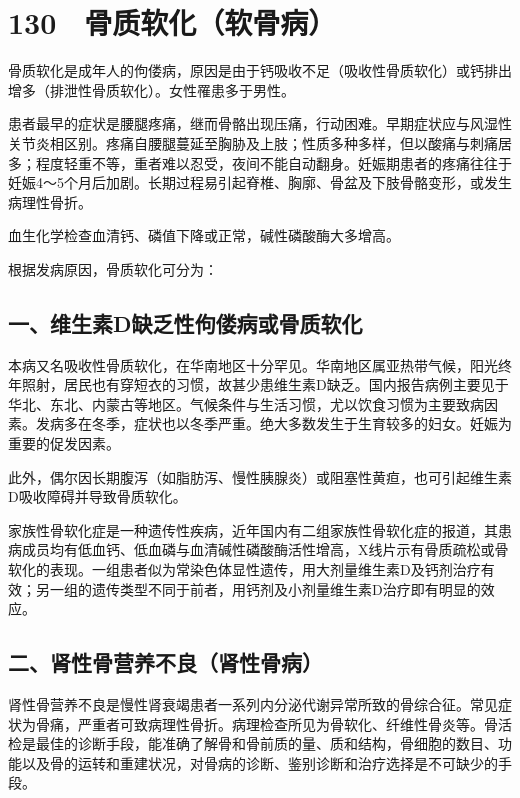 \protect\hypertarget{text00308.html}{}{}

\section{130　骨质软化（软骨病）}

骨质软化是成年人的佝偻病，原因是由于钙吸收不足（吸收性骨质软化）或钙排出增多（排泄性骨质软化）。女性罹患多于男性。

患者最早的症状是腰腿疼痛，继而骨骼出现压痛，行动困难。早期症状应与风湿性关节炎相区别。疼痛自腰腿蔓延至胸胁及上肢；性质多种多样，但以酸痛与刺痛居多；程度轻重不等，重者难以忍受，夜间不能自动翻身。妊娠期患者的疼痛往往于妊娠4～5个月后加剧。长期过程易引起脊椎、胸廓、骨盆及下肢骨骼变形，或发生病理性骨折。

血生化学检查血清钙、磷值下降或正常，碱性磷酸酶大多增高。

根据发病原因，骨质软化可分为：

\subsection{一、维生素D缺乏性佝偻病或骨质软化}

本病又名吸收性骨质软化，在华南地区十分罕见。华南地区属亚热带气候，阳光终年照射，居民也有穿短衣的习惯，故甚少患维生素D缺乏。国内报告病例主要见于华北、东北、内蒙古等地区。气候条件与生活习惯，尤以饮食习惯为主要致病因素。发病多在冬季，症状也以冬季严重。绝大多数发生于生育较多的妇女。妊娠为重要的促发因素。

此外，偶尔因长期腹泻（如脂肪泻、慢性胰腺炎）或阻塞性黄疸，也可引起维生素D吸收障碍并导致骨质软化。

家族性骨软化症是一种遗传性疾病，近年国内有二组家族性骨软化症的报道，其患病成员均有低血钙、低血磷与血清碱性磷酸酶活性增高，X线片示有骨质疏松或骨软化的表现。一组患者似为常染色体显性遗传，用大剂量维生素D及钙剂治疗有效；另一组的遗传类型不同于前者，用钙剂及小剂量维生素D治疗即有明显的效应。

\subsection{二、肾性骨营养不良（肾性骨病）}

肾性骨营养不良是慢性肾衰竭患者一系列内分泌代谢异常所致的骨综合征。常见症状为骨痛，严重者可致病理性骨折。病理检查所见为骨软化、纤维性骨炎等。骨活检是最佳的诊断手段，能准确了解骨和骨前质的量、质和结构，骨细胞的数目、功能以及骨的运转和重建状况，对骨病的诊断、鉴别诊断和治疗选择是不可缺少的手段。

